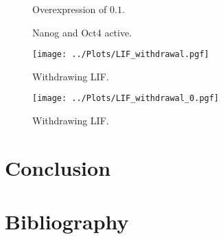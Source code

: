 \begin{figure}
\centering
\begin{minipage}[t]{0.3\textwidth}
\centering
\graphicspath{{../Plots/}}

\end{minipage}
\hfill
\begin{minipage}[t]{0.3\textwidth}
\centering
\graphicspath{{../Plots/}}

\end{minipage}
\hspace*{0.2cm}
\begin{minipage}[t]{0.3\textwidth}
\centering
\graphicspath{{../Plots/}}

\end{minipage}
\caption{Overexpression of $0.1$.}
\label{pl:NOT_0.1}
\end{figure}



\begin{figure}
\centering
\begin{minipage}[t]{0.3\textwidth}
\centering
\graphicspath{{../Plots/}}

\end{minipage}
\hspace*{0.5cm}
\begin{minipage}[t]{0.3\textwidth}
\centering
\graphicspath{{../Plots/}}

\end{minipage}
\caption{Nanog and Oct4 active.}
\label{pl:NO}
\end{figure}


\begin{figure}
  \centering
  \graphicspath{{../Plots/}}
  \texttt{[image: ../Plots/LIF\_withdrawal.pgf]}
  \caption{Withdrawing LIF.}
  \label{pl:LIF_withdrawal}
\end{figure}


\begin{figure}
  \centering
  \graphicspath{{../Plots/}}
  \texttt{[image: ../Plots/LIF\_withdrawal\_0.pgf]}
  \caption{Withdrawing LIF.}
  \label{pl:LIF_withdrawal}
\end{figure}
    
\section{Conclusion}

\newpage
\section*{Bibliography}
\nocite{*}
\printbibliography[heading=none, keyword={secondary}]



